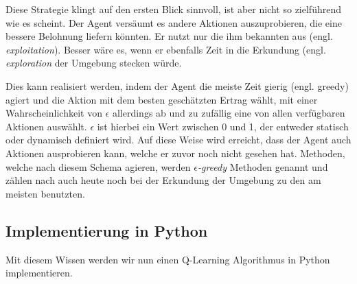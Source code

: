 Diese Strategie klingt auf den ersten Blick sinnvoll, ist aber nicht so zielführend wie es scheint. Der Agent versäumt es andere Aktionen auszuprobieren, die eine bessere Belohnung liefern könnten. Er nutzt nur die ihm bekannten aus (engl. \textit{exploitation}). Besser wäre es, wenn er ebenfalls Zeit in die Erkundung (engl. \textit{exploration} der Umgebung stecken würde.

Dies kann realisiert werden, indem der Agent die meiste Zeit \glqq gierig\grqq{} (engl. greedy) agiert und die Aktion mit dem besten geschätzten Ertrag wählt, mit einer Wahrscheinlichkeit von $ \epsilon $ allerdings ab und zu zufällig eine von allen verfügbaren Aktionen auswählt. $ \epsilon $ ist hierbei ein Wert zwischen 0 und 1, der entweder statisch oder dynamisch definiert wird. Auf diese Weise wird erreicht, dass der Agent auch Aktionen ausprobieren kann, welche er zuvor noch nicht gesehen hat. Methoden, welche nach diesem Schema agieren, werden \textit{$ \epsilon $-greedy} Methoden genannt und zählen nach \cite{07_dabney2020temporallyextended} auch heute noch bei der Erkundung der Umgebung zu den am meisten benutzten.

\subsection{Implementierung in Python} \label{sec:qLearningImplementation}
Mit diesem Wissen werden wir nun einen Q-Learning Algorithmus in Python implementieren.

